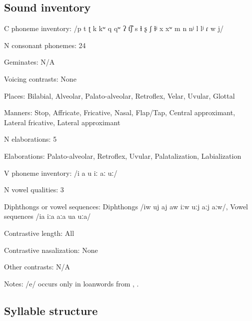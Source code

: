 {\subsection*{Sound inventory}
\begin{appendixdesc}

\item[C phoneme inventory:] /p t ʈ k kʷ q qʷ ʔ t͡ʃ s ɬ ʂ ʃ ɬʲ x xʷ m n nʲ l lʲ ɾ w j/

\item[N consonant phonemes:] 24

\item[Geminates:] N/A

\item[Voicing contrasts:] None

\item[Places:] Bilabial, Alveolar, Palato-alveolar, Retroflex, Velar, Uvular, Glottal

\item[Manners:] Stop, Affricate, Fricative, Nasal, Flap/Tap, Central approximant, Lateral fricative, Lateral approximant

\item[N elaborations:] 5

\item[Elaborations:] Palato-alveolar, Retroflex, Uvular, Palatalization, Labialization

\item[V phoneme inventory:] /i a u iː aː uː/

\item[N vowel qualities:] 3

\item[Diphthongs or vowel sequences:] Diphthongs /iw uj aj aw iːw uːj aːj aːw/, Vowel sequences /ia iːa aːa ua uːa/

\item[Contrastive length:] All

\item[Contrastive nasalization:] None

\item[Other contrasts:] N/A

\item[Notes:] /e/ occurs only in loanwords from , .
\end{appendixdesc}
\subsection*{Syllable structure}
\begin{appendixdesc}


\end{appendixdesc}}
